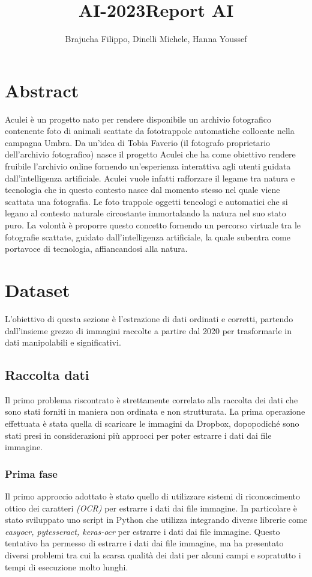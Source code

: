 \title{AI-2023}\documentclass[12pt,a4paper,twoside]{article}
\author{Brajucha Filippo, Dinelli Michele, Hanna Youssef}
\title{Report AI}
\begin{document}
\maketitle

\section*{Abstract}
Aculei è un progetto nato per rendere disponibile un archivio fotografico contenente foto di animali scattate 
da fototrappole automatiche collocate nella campagna Umbra. Da un'idea di Tobia Faverio (il fotografo proprietario dell'archivio fotografico)
nasce il progetto Aculei che ha come obiettivo rendere fruibile l'archivio online fornendo un'esperienza interattiva agli utenti guidata
dall'intelligenza artificiale. Aculei vuole infatti rafforzare il legame tra natura e tecnologia che in questo contesto nasce dal momento stesso
nel quale viene scattata una fotografia. Le foto trappole oggetti tencologi e automatici che si legano al contesto naturale circostante immortalando
la natura nel suo stato puro. La volontà è proporre questo concetto fornendo un percorso virtuale tra le fotografie scattate, guidato dall'intelligenza
artificiale, la quale subentra come portavoce di tecnologia, affiancandosi alla natura.       
\newpage

\tableofcontents

\newpage

\section{Dataset}
L'obiettivo di questa sezione è l'estrazione di dati ordinati e corretti, partendo dall'insieme grezzo di immagini 
raccolte a partire dal 2020 per trasformarle in dati manipolabili e significativi.

\subsection{Raccolta dati}
Il primo problema riscontrato è strettamente correlato alla raccolta dei dati
che sono stati forniti in maniera non ordinata e non strutturata. La prima operazione effettuata è stata quella di scaricare le immagini da Dropbox, dopopodiché sono stati presi in considerazioni più approcci per poter estrarre i dati dai file immagine.
\subsubsection{Prima fase}
Il primo approccio adottato è stato quello di utilizzare sistemi di riconoscimento ottico dei caratteri \textit{(OCR)} per estrarre i dati dai file immagine. In particolare è stato sviluppato uno script in Python che utilizza integrando diverse librerie come \textit{easyocr, pytesseract, keras-ocr} per estrarre i dati dai file immagine. Questo tentativo ha permesso di estrarre i dati dai file immagine, ma ha presentato diversi problemi tra cui la scarsa qualità dei dati per alcuni campi e sopratutto i tempi di esecuzione molto lunghi. 
\end{document}
